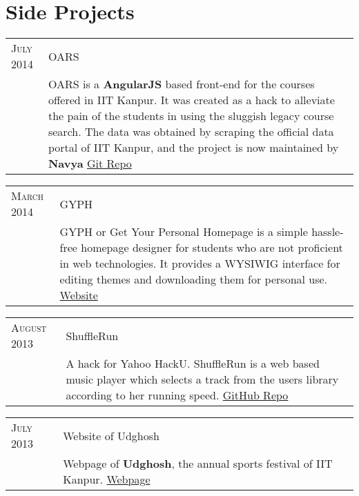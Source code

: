\documentclass[a4paper,10pt]{article} %
\begin{document}
\section{Side Projects}

\begin{tabular}{p{2.2cm}|p{11cm}}
    \textsc{July 2014} & OARS\\
                       & \footnotesize{OARS is a \textbf{AngularJS} based front-end for the
                          courses offered in IIT Kanpur. It was created as a
                          hack to alleviate the pain of the students in using the
                          sluggish legacy course search. The data was obtained by
                          scraping the official data portal of IIT Kanpur, and the
                          project is now maintained by \textbf{Navya}
                          \href{https://github.com/navya/oars} {Git Repo} }\\

\end{tabular}

\begin{tabular}{p{2.2cm}|p{11cm}}
    \textsc{March 2014} & GYPH\\
                        & \footnotesize{GYPH or Get Your Personal Homepage
                           is a simple hassle-free homepage designer for students who are not
                           proficient in web technologies. It provides a WYSIWIG
                           interface for editing themes and downloading them for personal use.
                           \href{http://gyph2.herokuapp.com/} {Website} } \\
\end{tabular}

\begin{tabular}{p{2.2cm}|p{11cm}}
    \textsc{August 2013} & ShuffleRun\\
                         & \footnotesize{A hack for Yahoo HackU. ShuffleRun is a
                            web based music player which selects a track from the users library
                            according to her running speed.
                            \href{https://github.com/srijanshetty/ShuffleRun} {GitHub Repo} }\\
\end{tabular}

\begin{tabular}{p{2.2cm}|p{11cm}}
    \textsc{July 2013} & Website of Udghosh\\
                       & \footnotesize{Webpage of \textbf{Udghosh}, the annual sports festival of
                          IIT Kanpur. \href{www.udghosh.org} {Webpage} } \\
\end{tabular}
\end{document}

